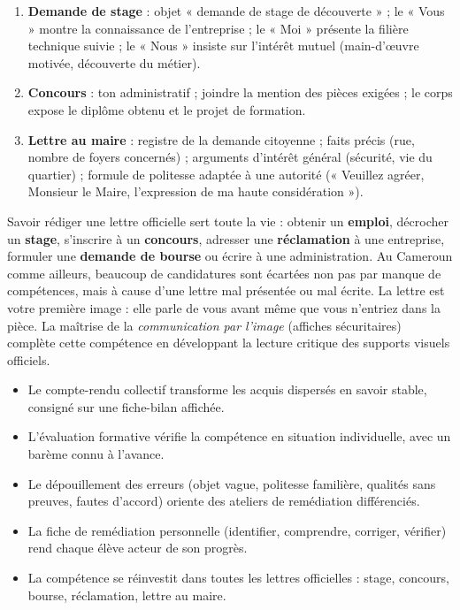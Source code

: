 \documentclass[11pt]{article}
\begin{document}
\begin{corrige}
\begin{enumerate}
\item \textbf{Demande de stage} : objet « demande de stage de découverte » ; le « Vous » montre la connaissance de l'entreprise ; le « Moi » présente la filière technique suivie ; le « Nous » insiste sur l'intérêt mutuel (main-d'œuvre motivée, découverte du métier).
\item \textbf{Concours} : ton administratif ; joindre la mention des pièces exigées ; le corps expose le diplôme obtenu et le projet de formation.
\item \textbf{Lettre au maire} : registre de la demande citoyenne ; faits précis (rue, nombre de foyers concernés) ; arguments d'intérêt général (sécurité, vie du quartier) ; formule de politesse adaptée à une autorité (« Veuillez agréer, Monsieur le Maire, l'expression de ma haute considération »).
\end{enumerate}
\end{corrige}

\begin{savaistu}
Savoir rédiger une lettre officielle sert toute la vie : obtenir un \textbf{emploi}, décrocher un \textbf{stage}, s'inscrire à un \textbf{concours}, adresser une \textbf{réclamation} à une entreprise, formuler une \textbf{demande de bourse} ou écrire à une administration. Au Cameroun comme ailleurs, beaucoup de candidatures sont écartées non pas par manque de compétences, mais à cause d'une lettre mal présentée ou mal écrite. La lettre est votre première image : elle parle de vous avant même que vous n'entriez dans la pièce. La maîtrise de la \emph{communication par l'image} (affiches sécuritaires) complète cette compétence en développant la lecture critique des supports visuels officiels.
\end{savaistu}

\begin{aretenir}
\begin{itemize}
\item Le compte-rendu collectif transforme les acquis dispersés en savoir stable, consigné sur une fiche-bilan affichée.
\item L'évaluation formative vérifie la compétence en situation individuelle, avec un barème connu à l'avance.
\item Le dépouillement des erreurs (objet vague, politesse familière, qualités sans preuves, fautes d'accord) oriente des ateliers de remédiation différenciés.
\item La fiche de remédiation personnelle (identifier, comprendre, corriger, vérifier) rend chaque élève acteur de son progrès.
\item La compétence se réinvestit dans toutes les lettres officielles : stage, concours, bourse, réclamation, lettre au maire.
\end{itemize}
\end{aretenir}
\end{document}
